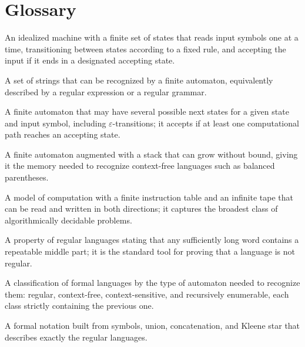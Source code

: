 \section*{Glossary}
\begin{description}[leftmargin=*,style=nextline,itemsep=0.3em]

\item[\textbf{Finite automaton.}] An idealized machine with a finite set of states that reads input symbols one at a time, transitioning between states according to a fixed rule, and accepting the input if it ends in a designated accepting state.

\item[\textbf{Regular language.}] A set of strings that can be recognized by a finite automaton, equivalently described by a regular expression or a regular grammar.

\item[\textbf{Nondeterministic finite automaton (NFA).}] A finite automaton that may have several possible next states for a given state and input symbol, including $\varepsilon$-transitions; it accepts if at least one computational path reaches an accepting state.

\item[\textbf{Pushdown automaton.}] A finite automaton augmented with a stack that can grow without bound, giving it the memory needed to recognize context-free languages such as balanced parentheses.

\item[\textbf{Turing machine.}] A model of computation with a finite instruction table and an infinite tape that can be read and written in both directions; it captures the broadest class of algorithmically decidable problems.

\item[\textbf{Pumping lemma.}] A property of regular languages stating that any sufficiently long word contains a repeatable middle part; it is the standard tool for proving that a language is not regular.

\item[\textbf{Chomsky hierarchy.}] A classification of formal languages by the type of automaton needed to recognize them: regular, context-free, context-sensitive, and recursively enumerable, each class strictly containing the previous one.

\item[\textbf{Regular expression.}] A formal notation built from symbols, union, concatenation, and Kleene star that describes exactly the regular languages.


\end{description}
